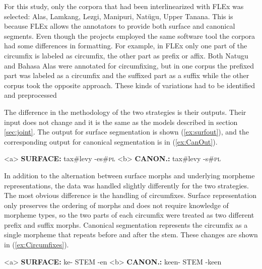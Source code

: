 For this study, only the corpora that had been interlinearized with FLEx was selected:  Alas, Lamkang, Lezgi, Manipuri, Nat\"ugu, Upper Tanana. This is because FLEx allows the annotators to provide both surface and canonical segments.
Even though the projects employed the same software tool the corpora had some differences in formatting. For example, in FLEx only one part of the circumfix is labeled as circumfix, the other part as prefix or affix. Both Natugu and Bahasa Alas were annotated for circumfixing, but in one corpus the prefixed part was labeled as a circumfix and the suffixed part as a suffix while the other corpus took the opposite approach. These kinds of variations had to be identified and preprocessed

The difference in the methodology of the two strategies is their outputs. Their input does not change and it is the same as the models described in section \ref{sec:joint}. The output for surface segmentation is shown (\ref{ex:surfout}), and the corresponding output for canonical segmentation is in (\ref{ex:CanOut}).

\pex   
\label{ex:CanInOut}
\a<a> \textbf{SURFACE:} \hspace{2 mm} tax\#levy \hspace{3 mm} -es\#\textsc{pl}
\label{ex:surfout}
\a<b> \textbf{CANON.:} \hspace{4 mm} tax\#levy \hspace{3 mm} -s\#\textsc{pl} 
\label{ex:CanOut}
\xe

In addition to the alternation between surface morphs and underlying morpheme representations, the data was handled slightly differently for the two strategies. The most obvious difference is the handling of circumfixes. Surface representation only preserves the ordering of morphs and does not require knowledge of morpheme types, so the two parts of each circumfix were treated as two different prefix and suffix morphs.  Canonical segmentation represents the circumfix as a single morpheme that repeats before and after the stem. These changes are shown in (\ref{ex:Circumfixes}).

\pex   
\label{ex:Circumfixes}
\a<a> \textbf{SURFACE:} \hspace{2 mm} ke- \hspace{4 mm}  STEM  \hspace{1 mm} -en
\label{ex:circumsurf}
\a<b> \textbf{CANON.:} \hspace{1 mm} ke\textlangle{}\textrangle{}en- \hspace{1 mm} STEM \hspace{1 mm} -ke\textlangle{}\textrangle{}en
\label{ex:circumcan}
\xe

